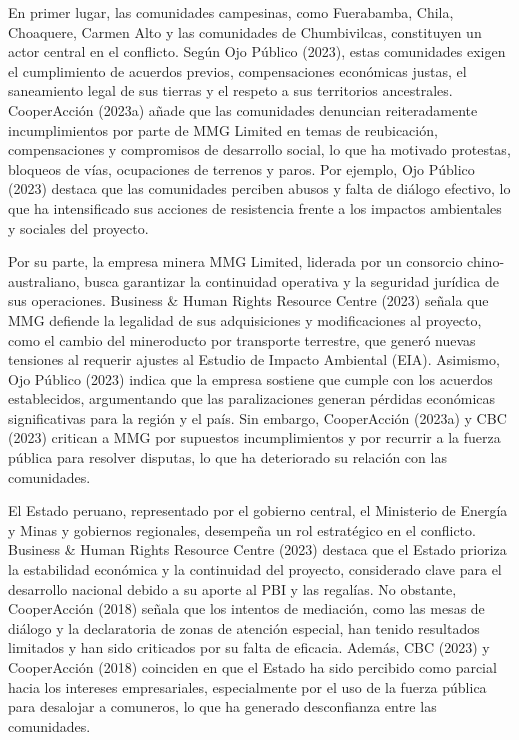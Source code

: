 \documentclass[
  stu,
  floatsintext,
  longtable,
  a4paper,
  nolmodern,
  notxfonts,
  notimes,
  colorlinks=true,linkcolor=blue,citecolor=blue,urlcolor=blue]{apa7}
\begin{document}
En primer lugar, las comunidades campesinas, como Fuerabamba, Chila,
Choaquere, Carmen Alto y las comunidades de Chumbivilcas, constituyen un
actor central en el conflicto. Según Ojo Público (2023), estas
comunidades exigen el cumplimiento de acuerdos previos, compensaciones
económicas justas, el saneamiento legal de sus tierras y el respeto a
sus territorios ancestrales. CooperAcción (2023a) añade que las
comunidades denuncian reiteradamente incumplimientos por parte de MMG
Limited en temas de reubicación, compensaciones y compromisos de
desarrollo social, lo que ha motivado protestas, bloqueos de vías,
ocupaciones de terrenos y paros. Por ejemplo, Ojo Público (2023) destaca
que las comunidades perciben abusos y falta de diálogo efectivo, lo que
ha intensificado sus acciones de resistencia frente a los impactos
ambientales y sociales del proyecto.

Por su parte, la empresa minera MMG Limited, liderada por un consorcio
chino-australiano, busca garantizar la continuidad operativa y la
seguridad jurídica de sus operaciones. Business \& Human Rights Resource
Centre (2023) señala que MMG defiende la legalidad de sus adquisiciones
y modificaciones al proyecto, como el cambio del mineroducto por
transporte terrestre, que generó nuevas tensiones al requerir ajustes al
Estudio de Impacto Ambiental (EIA). Asimismo, Ojo Público (2023) indica
que la empresa sostiene que cumple con los acuerdos establecidos,
argumentando que las paralizaciones generan pérdidas económicas
significativas para la región y el país. Sin embargo, CooperAcción
(2023a) y CBC (2023) critican a MMG por supuestos incumplimientos y por
recurrir a la fuerza pública para resolver disputas, lo que ha
deteriorado su relación con las comunidades.

El Estado peruano, representado por el gobierno central, el Ministerio
de Energía y Minas y gobiernos regionales, desempeña un rol estratégico
en el conflicto. Business \& Human Rights Resource Centre (2023) destaca
que el Estado prioriza la estabilidad económica y la continuidad del
proyecto, considerado clave para el desarrollo nacional debido a su
aporte al PBI y las regalías. No obstante, CooperAcción (2018) señala
que los intentos de mediación, como las mesas de diálogo y la
declaratoria de zonas de atención especial, han tenido resultados
limitados y han sido criticados por su falta de eficacia. Además, CBC
(2023) y CooperAcción (2018) coinciden en que el Estado ha sido
percibido como parcial hacia los intereses empresariales, especialmente
por el uso de la fuerza pública para desalojar a comuneros, lo que ha
generado desconfianza entre las comunidades.
\end{document}
